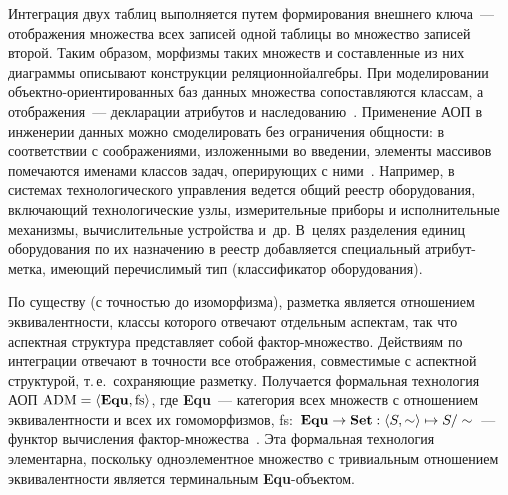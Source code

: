 \begin{multicols}{2}
Интеграция двух 
таб\-лиц выполняется путем формирования внешнего ключа~--- отображения\linebreak 
множества всех записей одной таб\-ли\-цы во множество записей второй. Таким 
образом, морфизмы таких множеств и составленные из них диаграммы 
описывают конструкции реляционной\linebreak алгебры. При моделировании 
   объ\-ект\-но-ори\-ен\-ти\-ро\-ван\-ных баз данных множества сопоставляются 
классам, а отображения~--- декларации атрибутов и 
   наследованию~\cite{17-kov}. Применение АОП в инженерии данных можно 
смоделировать без ограничения общности: в соответствии с соображениями, 
изложенными во введении, элементы массивов помечаются именами классов 
задач, оперирующих с ними~\cite{18-kov}. Например, в системах 
технологического управления ведется общий реестр оборудования, 
включающий технологические узлы, измерительные приборы и 
исполнительные механизмы, вы\-чис\-ли\-тель\-ные устройства и~др. В~целях 
разделения единиц оборудования по их назначению в реестр добав\-ляется 
специальный ат\-ри\-бут-мет\-ка, име\-ющий перечислимый тип (классификатор 
оборудования). 

По существу (с точностью до изоморфизма), разметка является 
отношением эквивалентности, классы которого отвечают отдельным аспектам, 
так что аспектная структура представляет собой фак\-тор-мно\-жест\-во. 
Действиям по интеграции отвечают в точности все отображения, со\-вмес\-ти\-мые 
с аспектной структурой, т.\,е.\ сохраняющие разметку. Получается формальная 
технология АОП $\mathrm{ADM}\hm = \langle\mathbf{Equ}, \mathrm{fs}\rangle$, где 
   \textbf{Equ}~--- категория всех множеств с отношением эквивалентности и 
всех их гомоморфизмов, fs:\ $\mathbf{Equ}\hm\rightarrow \mathbf{Set}: \langle 
S, \sim\rangle \mapsto S/\sim$~--- функтор вычисления 
   фак\-тор-мно\-жест\-ва~\cite{13-kov}. Эта формальная технология 
элементарна, поскольку одноэлементное множество с тривиальным 
отношением эквивалентности является терминальным \textbf{Equ}-объ\-ектом.
   

\end{multicols}

